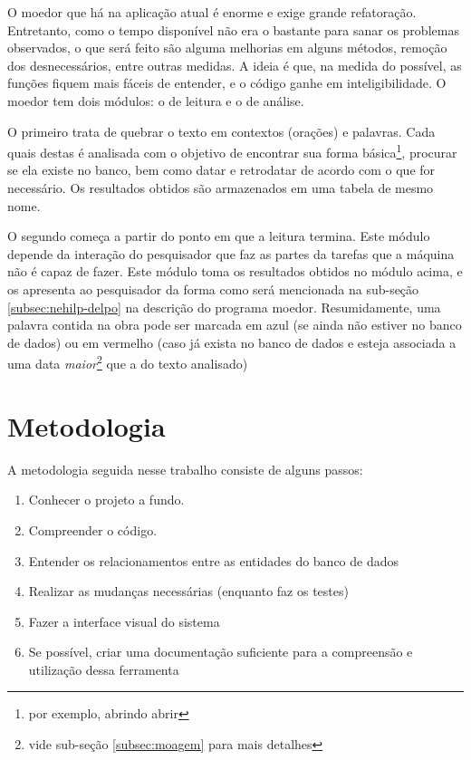 O moedor que há na aplicação atual é enorme e exige grande refatoração. Entretanto, como o tempo disponível não 
era o bastante para sanar os problemas observados, o que será feito são alguma melhorias em alguns métodos,
remoção dos desnecessários, entre outras medidas. A ideia é que, na medida do possível, as funções fiquem mais
fáceis de entender, e o código ganhe em inteligibilidade. O moedor tem dois módulos: o de leitura e o de análise.

O primeiro trata de quebrar o texto em contextos (orações) e palavras. Cada quais destas é analisada com o
objetivo de encontrar sua forma básica\footnote{por exemplo, abrindo \dir abrir}, procurar se ela existe no
banco, bem como datar e retrodatar de acordo com o que for necessário. Os resultados obtidos são armazenados
em uma tabela de mesmo nome.

O segundo começa a partir do ponto em que a leitura termina. Este módulo depende da interação do pesquisador
que faz as partes da tarefas que a máquina não é capaz de fazer. Este módulo toma os resultados obtidos no
módulo acima, e os apresenta ao pesquisador da forma como será mencionada na sub-seção \ref{subsec:nehilp-delpo}
na descrição do programa moedor. Resumidamente, uma palavra contida na obra pode ser marcada em azul (se ainda
não estiver no banco de dados) ou em vermelho (caso já exista no banco de dados e esteja associada a uma data
\emph{maior}\footnote{vide sub-seção \ref{subsec:moagem} para mais detalhes} que a do texto analisado)

\section{Metodologia}
\label{sec:methodology}

A metodologia seguida nesse trabalho consiste de alguns passos:
\begin{enumerate}
    \item Conhecer o projeto a fundo.
    \item Compreender o código.
    \item Entender os relacionamentos entre as entidades do banco de dados
    \item Realizar as mudanças necessárias (enquanto faz os testes)
    \item Fazer a interface visual do sistema
    \item Se possível, criar uma documentação suficiente para a compreensão e
    utilização dessa ferramenta
\end{enumerate}

